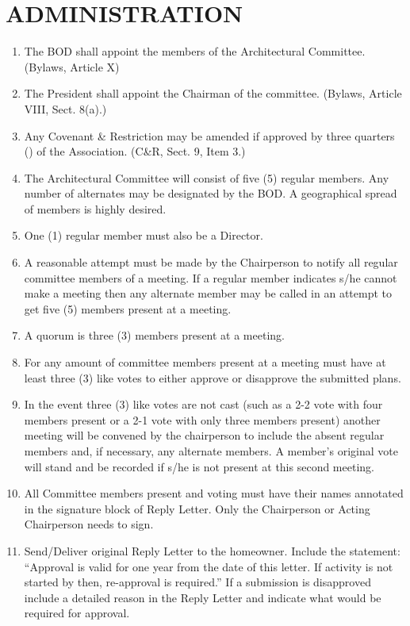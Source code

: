 \documentclass[10pt, letterpaper]{article}
\begin{document}
\section{ADMINISTRATION}
\begin{enumerate}
  \item The BOD shall appoint the members of the Architectural Committee.
    \hfill (Bylaws, Article X)
  \item The President shall appoint the Chairman of the committee.
    \hfill (Bylaws, Article VIII, Sect. 8(a).)
  \item Any Covenant \& Restriction may be amended if approved by three quarters (\textthreequarters) of the Association.
    \hfill (C\&R, Sect. 9, Item 3.)
  \item The Architectural Committee will consist of five (5) regular members. Any number of alternates may be designated by the BOD. A geographical spread of members is highly desired.
  \item One (1) regular member must also be a Director.
  \item A reasonable attempt must be made by the Chairperson to notify all regular committee members of a meeting.
    If a regular member indicates s/he cannot make a meeting then any alternate member may be called in an attempt to get five (5) members present at a meeting.
  \item A quorum is three (3) members present at a meeting.
  \item For any amount of committee members present at a meeting must have at least three (3) like votes to either approve or disapprove the submitted plans.
  \item In the event three (3) like votes are not cast (such as a 2-2 vote with four members present or a 2-1 vote with only three members present) another meeting will be convened by the chairperson to include the absent regular members and, if necessary, any alternate members.
    A member's original vote will stand and be recorded if s/he is not present at this second meeting.
  \item All Committee members present and voting must have their names annotated in the signature block of Reply Letter.
    Only the Chairperson or Acting Chairperson needs to sign.
  \item Send/Deliver original Reply Letter to the homeowner.
    Include the statement:
    ``Approval is valid for one year from the date of this letter. If activity is not started by then, re-approval is required.''
    If a submission is disapproved include a detailed reason in the Reply Letter and indicate what would be required for approval.

\end{enumerate}
\end{document}
